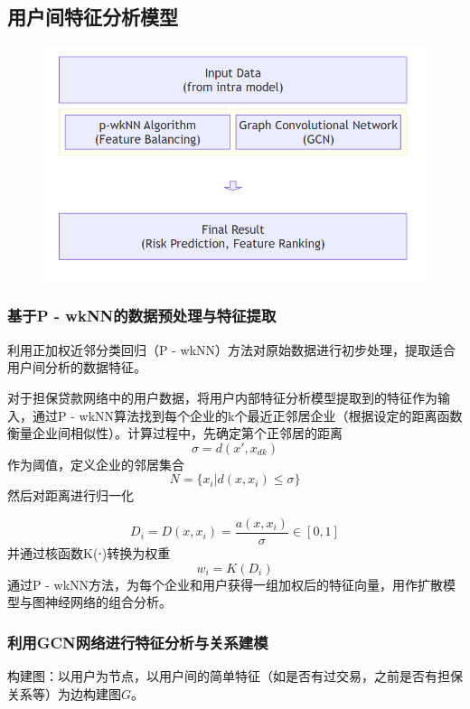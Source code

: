 \documentclass{article}
\begin{document}
\subsection{用户间特征分析模型}
\begin{figure}[htb]
	\centering
	\includegraphics[width=\linewidth]{2.png}
\end{figure}




\subsubsection{基于P - wkNN的数据预处理与特征提取}

利用正加权近邻分类回归（P - wkNN）方法对原始数据进行初步处理，提取适合用户间分析的数据特征\cite{macleod1987re}。

对于担保贷款网络中的用户数据，将用户内部特征分析模型提取到的特征作为输入，通过P - wkNN算法找到每个企业的k个最近正邻居企业（根据设定的距离函数衡量企业间相似性）。计算过程中，先确定第个正邻居的距离
\[
\sigma = d\left(x', x_{dk}\right)
\]
作为阈值，定义企业的邻居集合
\[
N = \{ x_i | d(x, x_i) \leq \sigma \}
\]
然后对距离进行归一化

\[
D_i = D(x, x_i) = \frac{a(x, x_i)}{\sigma} \in [0, 1]
\]
并通过核函数K(⋅)转换为权重\[
w_i = K(D_i)
\]
通过P - wkNN方法，为每个企业和用户获得一组加权后的特征向量，用作扩散模型与图神经网络的组合分析。

\subsubsection{利用GCN网络进行特征分析与关系建模\cite{kipf2016semi}}

构建图：以用户为节点，以用户间的简单特征（如是否有过交易，之前是否有担保关系等）为边构建图$G$。
\end{document}
